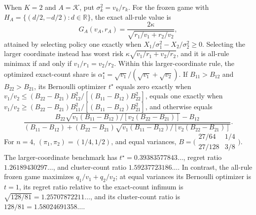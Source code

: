 When \(K=2\) and \(A=\mathcal K\), put \(\sigma_k^2=v_k/r_k\).  For the frozen game with \(H_A=\{(d/2,-d/2):d\in\mathbb R\}\), the exact all-rule value is
\[
G_A(v_A,r_A)=\frac{2\kappa}{\sqrt{r_1/v_1+r_2/v_2}},
\]
attained by selecting policy one exactly when \(X_1/\sigma_1^2-X_2/\sigma_2^2\geq0\).  Selecting the larger coordinate instead has worst risk \(\kappa\sqrt{v_1/r_1+v_2/r_2}\), and it is all-rule minimax if and only if \(v_1/r_1=v_2/r_2\).  Within this larger-coordinate rule, the optimized exact-count share is \(\alpha_1^\star=\sqrt{v_1}/(\sqrt{v_1}+\sqrt{v_2})\). If \(B_{11}>B_{12}\) and \(B_{22}>B_{21}\), its Bernoulli optimizer \(t^\star\) equals zero exactly when \(v_1/v_2\leq(B_{22}-B_{21})B_{12}^2/[(B_{11}-B_{12})B_{22}^2]\), equals one exactly when \(v_1/v_2\geq(B_{22}-B_{21})B_{11}^2/[(B_{11}-B_{12})B_{21}^2]\), and otherwise equals
\[
\frac{B_{22}\sqrt{v_1(B_{11}-B_{12})/[v_2(B_{22}-B_{21})]}-B_{12}}{(B_{11}-B_{12})+(B_{22}-B_{21})\sqrt{v_1(B_{11}-B_{12})/[v_2(B_{22}-B_{21})]} }.
\]
For \(n=4\), \((\pi_1,\pi_2)=(1/4,1/2)\), and equal variances, \(B=\bigl(\begin{smallmatrix}27/64&1/4\\27/128&3/8\end{smallmatrix}\bigr)\).  The larger-coordinate benchmark has \(t^\star=0.39383577843\ldots\), regret ratio \(1.26189430297\ldots\), and cluster-count ratio \(1.59237723186\ldots\).  In contrast, the all-rule frozen game maximizes \(q_1/v_1+q_2/v_2\); at equal variances its Bernoulli optimizer is \(t=1\), its regret ratio relative to the exact-count infimum is \(\sqrt{128/81}=1.25707872211\ldots\), and its cluster-count ratio is \(128/81=1.58024691358\ldots\).